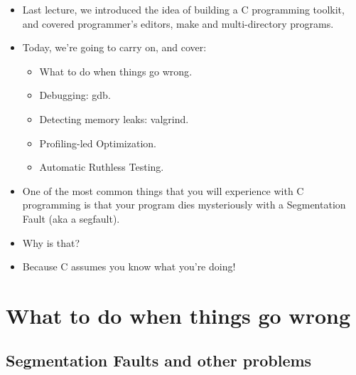 \documentclass[handout]{beamer}
\newcommand{\pitem}{\pause \item}
\begin{document}
\begin{frame}[fragile]
  \begin{itemize}
    \item
      Last lecture, we introduced the idea of building a
      \alert{C programming toolkit},
      and covered programmer's editors, make and multi-directory programs.

    \pitem
      Today, we're going to carry on, and cover:
      \begin{itemize}
      \item
        \alert{What to do when things go wrong}.
      \item
        \alert{Debugging: gdb}.
      \pitem
        \alert{Detecting memory leaks: valgrind}.
      \pitem
        \alert{Profiling-led Optimization}.
      \pitem
        \alert{Automatic Ruthless Testing}.
    \end{itemize}


    \pitem
    One of the most common things that you will experience with C programming
    is that your program dies mysteriously with a \alert{Segmentation Fault} (aka a \alert{segfault}).
    
    \item
    Why is that?

    \pitem
    \alert{Because C assumes you know what you're doing}!

  \end{itemize}
\end{frame}

\section{What to do when things go wrong}
\subsection{Segmentation Faults and other problems}
\end{document}
